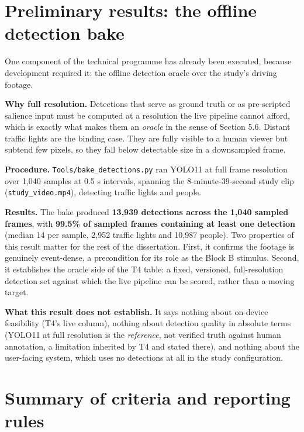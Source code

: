 \section{Preliminary results: the offline detection bake}

One component of the technical programme has already been executed, because development required
it: the offline detection oracle over the study's driving footage.

\textbf{Why full resolution.} Detections that serve as ground truth or as pre-scripted salience input
must be computed at a resolution the live pipeline cannot afford, which is exactly what makes them an
\textit{oracle} in the sense of Section 5.6. Distant traffic lights are the binding case. They are fully
visible to a human viewer but subtend few pixels, so they fall below detectable size in a downsampled
frame.

\textbf{Procedure.} \verb|Tools/bake_detections.py| ran YOLO11 at full frame resolution over 1,040
samples at 0.5 s intervals, spanning the 8-minute-39-second study clip (\verb|study_video.mp4|),
detecting traffic lights and people.

\textbf{Results.} The bake produced \textbf{13,939 detections across the 1,040 sampled frames}, with
\textbf{99.5\% of sampled frames containing at least one detection} (median 14 per sample, 2,952
traffic lights and 10,987 people). Two properties of this result matter for the
rest of the dissertation. First, it confirms the footage is genuinely event-dense, a precondition
for its role as the Block B stimulus. Second, it establishes the oracle side of the T4 table: a fixed, versioned, full-resolution
detection set against which the live pipeline can be scored, rather than a moving target.

\textbf{What this result does not establish.} It says nothing about on-device feasibility (T4's live
column), nothing about detection quality in absolute terms (YOLO11 at full resolution is the
\textit{reference}, not verified truth against human annotation, a limitation inherited by T4 and stated
there), and nothing about the user-facing system, which uses no detections at all in the study
configuration.

\section{Summary of criteria and reporting rules}

